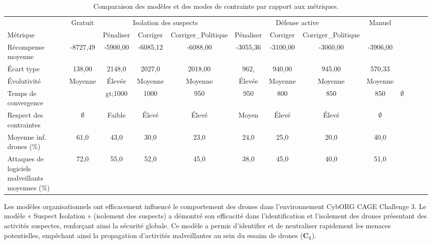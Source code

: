 \begin{table}[t]
    \centering
    \setlength{\tabcolsep}{4.5pt}
    \caption{Comparaison des modèles et des modes de contrainte par rapport aux métriques.}
    \label{tab:metrics_comparison}
    \begin{tabular}{lcccccccccccc}
                               & {Gratuit}      & \multicolumn{3}{c}{Isolation des suspects} & \multicolumn{3}{c}{Défense active} & {Manuel}                                                       \\
        Métrique                 &             & Pénaliser                              & Corriger                              & Corriger\_Politique  & Pénaliser & Corriger  & Corriger\_Politique &             \\
        \midrule
        Récompense moyenne         & -8727,49    & -5900,00                              & -6085,12                             & -6088,00         & -3055,36 & -3100,00 & -3060,00        & -3906,00    \\
        Écart type     & 138,00      & 2148,0                               & 2027,0                              & 2018,00          & 962,   & 940,00   & 945,00          & 570,33     \\
        Évolutivité            & Moyenne      & Élevée                                  & Moyenne                               & Moyenne  & Élevée     & Moyenne   & Moyenne & Moyenne      \\
        Temps de convergence & &gt;1000 & 1000 & 950 & 950 & 800 & 850 & 850 & $\emptyset$ \\
        Respect des contraintes     & $\emptyset$ & Faible                                   & Élevé                                 & Élevé             & Moyen   & Élevé     & Élevé            & $\emptyset$      \\
        Moyenne inf. drones (\%)  & 61,0        & 43,0                                  & 30,0                                 & 23,0             & 24,0     & 25,0     & 20,0            & 40,0        \\
        Attaques de logiciels malveillants moyennes (\%) & 72,0        & 55,0                                  & 52,0                                 & 45,0             & 38,0     & 45,0     & 40,0            & 51,0        \\
    \end{tabular}
\end{table}

Les modèles organisationnels ont efficacement influencé le comportement des drones dans l'environnement CybORG CAGE Challenge 3. Le modèle « Suspect Isolation » (isolement des suspects) a démontré son efficacité dans l'identification et l'isolement des drones présentant des activités suspectes, renforçant ainsi la sécurité globale. Ce modèle a permis d'identifier et de neutraliser rapidement les menaces potentielles, empêchant ainsi la propagation d'activités malveillantes au sein du essaim de drones ($\mathbf{C_1}$).

